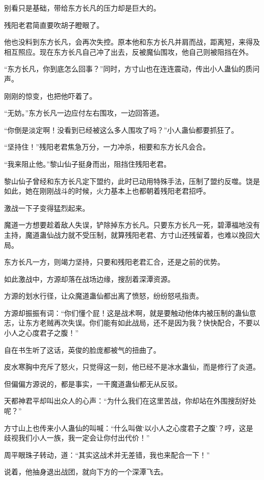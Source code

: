 \begin{this_body}
别看只是基础，带给东方长凡的压力却是巨大的。

残阳老君简直要吹胡子瞪眼了。

他也没料到东方长凡，会再次失控。原本他和东方长凡并肩而战，距离短，来得及相互照应。现在东方长凡自己冲了出去，反被魔仙围攻，他自己则被阻挡在外。

“东方长凡，你到底怎么回事？”同时，方寸山也在连连震动，传出小人蛊仙的质问声。

刚刚的惊变，也把他吓着了。

“无妨。”东方长凡一边应付左右围攻，一边回答道。

“你倒是淡定啊！没看到已经被这么多人围攻了吗？”小人蛊仙都要抓狂了。

“坚持住！”残阳老君焦急万分，一力冲杀，相要和东方长凡会合。

“我来阻止他。”黎山仙子挺身而出，阻挡住残阳老君。

黎山仙子曾经和东方长凡定下盟约，此时已动用特殊手法，压制了盟约反噬。饶是如此，她在刚刚战斗的时候，火力基本上也都朝着残阳老君招呼。

激战一下子变得猛烈起来。

魔道一方想要趁着敌人失误，铲除掉东方长凡。只要东方长凡一死，碧潭福地没有主持，魔道蛊仙战力就不受压制，就算残阳老君、方寸山还残留着，也难以挽回大局。

东方长凡一方，则竭力坚持，只要和残阳老君汇合，还是之前的优势。

如此激战中，方源却落在战场边缘，搜刮着深潭资源。

方源的划水行径，让众魔道蛊仙都出离了愤怒，纷纷怒吼指责。

方源却振振有词：“你们懂个屁！这是战术啊，就是要触动他体内被压制的蛊仙意志，让东方老贼再次失误。你们能有如此战局，还不是因为我？快快配合，不要以小人之心度君子之腹！”

自在书生听了这话，英俊的脸庞都被气的扭曲了。

皮水寒胸中充斥了怒火，只觉得这一刻，他已经不是冰水蛊仙，而是修行了炎道。

但偏偏方源说的，都是事实，一干魔道蛊仙都无从反驳。

天都神君平却叫出众人的心声：“为什么我们在这里苦战，你却站在外围搜刮好处呢？”

方寸山上也传来小人蛊仙的叫喊：“什么叫做‘以小人之心度君子之腹’？哼，这是歧视我们小人一族，我一定会让你付出代价！”

周平眼珠子转动，道：“其实这战术并无差错，我也来配合一下！”

说着，他抽身退出战团，就向下方的一个深潭飞去。


\end{this_body}

